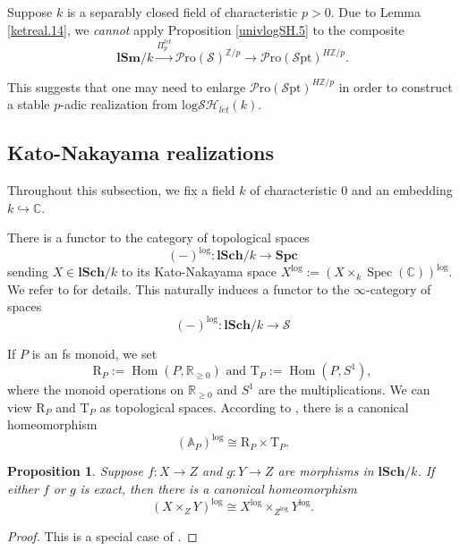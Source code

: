 \documentclass[11pt, a4paper]{amsart}
\newtheorem{prop}[thm]{Proposition}
\theoremstyle{definition}
\numberwithin{equation}{subsection}
\newcommand{\Z}{\mathbb{Z}}
\newcommand{\C}{\mathbb{C}}
\newcommand{\R}{\mathbb{R}}
\newcommand{\A}{\mathbb{A}}
\newcommand{\lSch}{\mathbf{lSch}}
\newcommand{\lSm}{\mathbf{lSm}}
\providecommand{\Spec}[1]{\operatorname{Spec}(#1)} 	%
\renewcommand{\hom}{\operatorname{Hom}}				 %
\newcommand{\leta}{{l\acute{e}t}}
\newcommand{\Eilenberg}{H}
\newcommand{\rR}{\mathrm{R}}
\newcommand{\rT}{\mathrm{T}}
\newcommand{\Spc}{\mathbf{Spc}}
\newcommand{\infSpc}{\mathcal{S}}
\newcommand{\infSpt}{\mathcal{S}\mathrm{pt}}
\newcommand{\infPro}{\mathcal{P}\mathrm{ro}}
\newcommand{\inflogSH}{\mathrm{log}\mathcal{SH}}
\begin{document}
Suppose $k$ is a separably closed field of characteristic $p>0$.
Due to Lemma \ref{ketreal.14}, 
we \emph{cannot} apply Proposition \ref{univlogSH.5} to the composite
\[
\lSm/k
\xrightarrow{\Pi_{p}^{\leta}}
\infPro(\infSpc)^{\Z/p}
\to
\infPro(\infSpt)^{\Eilenberg \Z/p}.
\]

This suggests that one may need to enlarge $\infPro(\infSpt)^{\Eilenberg \Z/p}$ in order to construct a 
stable $p$-adic realization from $\inflogSH_{\leta}(k)$.


\subsection{Kato-Nakayama realizations}

Throughout this subsection, 
we fix a field $k$ of characteristic $0$ and an embedding $k\hookrightarrow \C$.

There is a functor to the category of  topological spaces
\begin{equation}
(-)^{\log}
\colon
\lSch/k
\to
\Spc
\end{equation}
sending $X\in \lSch/k$ to its Kato-Nakayama space $X^{\log}:=(X\times_k \Spec{\C})^{\log}$.
We refer to \cite[\S 1]{MR1700591} for details.
This naturally induces a functor to the $\infty$-category of spaces
\begin{equation}
\label{KNreal.1.1}
(-)^{\log}
\colon
\lSch/k
\to
\infSpc
\end{equation}

If $P$ is an fs monoid, 
we set\index[notation]{RP @ $\rR_P$}\index[notation]{TP @ $\rT_P$}
\[
\rR_P:=\hom(P,\R_{\geq 0})
\text{ and }
\rT_P:=\hom(P,S^1),
\]
where the monoid operations on $\R_{\geq 0}$ and $S^1$ are the multiplications.
We can view $\rR_P$ and $\rT_P$ as topological spaces.
According to \cite[Example 1.2.1.1]{MR1700591}, 
there is a canonical homeomorphism
\begin{equation}
\label{KNreal.1.2}
(\A_P)^{\log}
\cong
\rR_P \times \rT_P.
\end{equation}


\begin{prop}
\label{KNreal.1}
Suppose $f\colon X\to Z$ and $g\colon Y\to Z$ are morphisms in $\lSch/k$.
If either $f$ or $g$ is exact, then there is a canonical homeomorphism
\[
(X\times_Z Y)^{\log}
\cong
X^{\log} \times_{Z^{\log}} Y^{\log}.
\]
\end{prop}
\begin{proof}
This is a special case of \cite[Proposition V.1.2.11]{Ogu}.
\end{proof}
\end{document}
